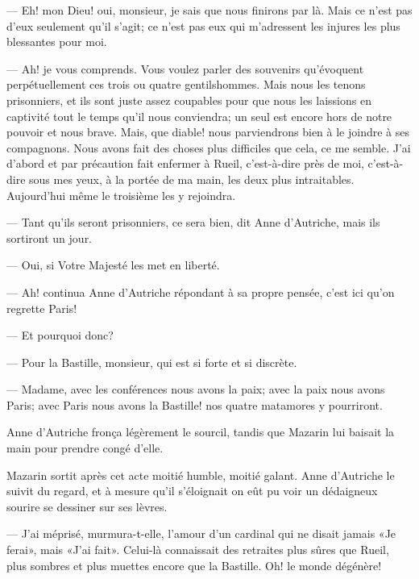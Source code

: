 — Eh! mon Dieu! oui, monsieur, je sais que nous finirons par là. Mais ce n'est pas d'eux seulement qu'il s'agit; ce n'est pas eux qui m'adressent les injures les plus blessantes pour moi.

— Ah! je vous comprends. Vous voulez parler des souvenirs qu'évoquent perpétuellement ces trois ou quatre gentilshommes. Mais nous les tenons prisonniers, et ils sont juste assez coupables pour que nous les laissions en captivité tout le temps qu'il nous conviendra; un seul est encore hors de notre pouvoir et nous brave. Mais, que diable! nous parviendrons bien à le joindre à ses compagnons. Nous avons fait des choses plus difficiles que cela, ce me semble. J'ai d'abord et par précaution fait enfermer à Rueil, c'est-à-dire près de moi, c'est-à-dire sous mes yeux, à la portée de ma main, les deux plus intraitables. Aujourd'hui même le troisième les y rejoindra.

— Tant qu'ils seront prisonniers, ce sera bien, dit Anne d'Autriche, mais ils sortiront un jour.

— Oui, si Votre Majesté les met en liberté.

— Ah! continua Anne d'Autriche répondant à sa propre pensée, c'est ici qu'on regrette Paris!

— Et pourquoi donc?

— Pour la Bastille, monsieur, qui est si forte et si discrète.

— Madame, avec les conférences nous avons la paix; avec la paix nous avons Paris; avec Paris nous avons la Bastille! nos quatre matamores y pourriront.

Anne d'Autriche fronça légèrement le sourcil, tandis que Mazarin lui baisait la main pour prendre congé d'elle.

Mazarin sortit après cet acte moitié humble, moitié galant. Anne d'Autriche le suivit du regard, et à mesure qu'il s'éloignait on eût pu voir un dédaigneux sourire se dessiner sur ses lèvres.

— J'ai méprisé, murmura-t-elle, l'amour d'un cardinal qui ne disait jamais «Je ferai», mais «J'ai fait». Celui-là connaissait des retraites plus sûres que Rueil, plus sombres et plus muettes encore que la Bastille. Oh! le monde dégénère!